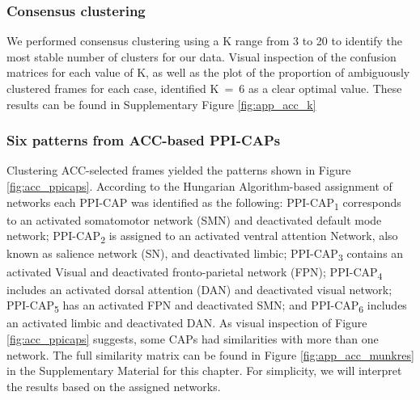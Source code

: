 \subsubsection{Consensus clustering}
We performed consensus clustering using a K range from 3 to 20 to identify the most stable number of clusters for our data. Visual inspection of the confusion matrices for each value of K, as well as the plot of the proportion of ambiguously clustered frames for each case, identified K~=~6 as a clear optimal value. These results can be found in Supplementary Figure \ref{fig:app_acc_k}

\subsubsection{Six patterns from ACC-based PPI-CAPs}
Clustering ACC-selected frames  yielded the patterns shown in Figure \ref{fig:acc_ppicaps}. According to the Hungarian Algorithm-based assignment of networks each PPI-CAP was identified as the following: PPI-CAP\textsubscript{1} corresponds to an activated somatomotor network (SMN) and deactivated default mode network;  PPI-CAP\textsubscript{2} is assigned to an activated ventral attention Network, also known as salience network (SN),  and deactivated limbic; PPI-CAP\textsubscript{3} contains an activated Visual and deactivated fronto-parietal network (FPN); PPI-CAP\textsubscript{4} includes an activated dorsal attention (DAN) and deactivated visual network; PPI-CAP\textsubscript{5} has an activated FPN and deactivated SMN; and PPI-CAP\textsubscript{6} includes an activated limbic and deactivated DAN. As visual inspection of Figure \ref{fig:acc_ppicaps} suggests, some CAPs had similarities with more than one network. The full similarity matrix can be found in Figure \ref{fig:app_acc_munkres} in the Supplementary Material for this chapter. For simplicity, we will interpret the results based on the assigned networks.









